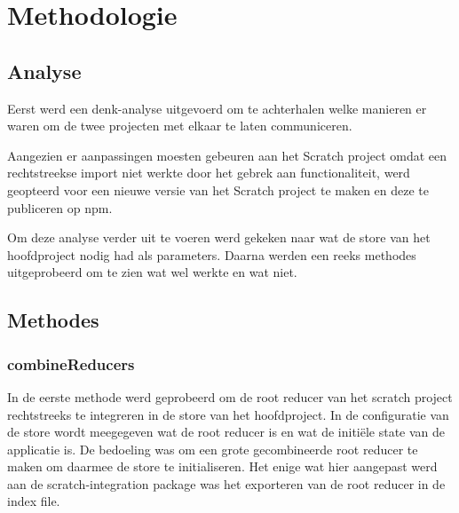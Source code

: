 
\chapter{Methodologie}
\label{ch:methodologie}


\section{Analyse}
Eerst werd een denk-analyse uitgevoerd om te achterhalen welke manieren er waren om de twee projecten met elkaar te laten communiceren.

Aangezien er aanpassingen moesten gebeuren aan het Scratch project omdat een rechtstreekse import niet werkte door het gebrek aan functionaliteit, werd geopteerd voor een nieuwe versie van het Scratch project te maken en deze te publiceren op npm. 

Om deze analyse verder uit te voeren werd gekeken naar wat de store van het hoofdproject nodig had als parameters. Daarna werden een reeks methodes uitgeprobeerd om te zien wat wel werkte en wat niet.


\section{Methodes}
\subsection{combineReducers}
In de eerste methode werd geprobeerd om de root reducer van het scratch project rechtstreeks te integreren in de store van het hoofdproject. In de configuratie van de store wordt meegegeven wat de root reducer is en wat de initiële state van de applicatie is. De bedoeling was om een grote gecombineerde root reducer te maken om daarmee de store te initialiseren. Het enige wat hier aangepast werd aan de scratch-integration package was het exporteren van de root reducer in de index file.

